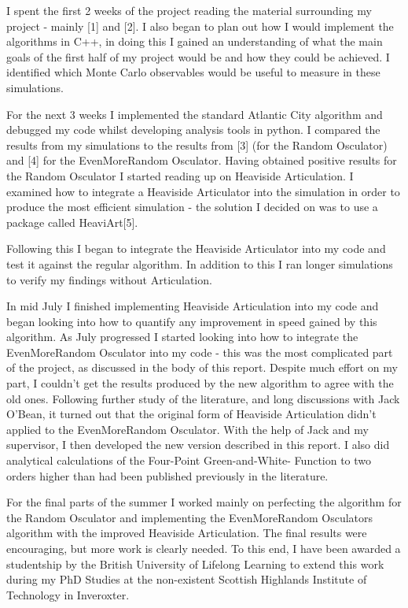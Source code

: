 \documentclass[12pt,a4paper]{report}
\begin{document}
I spent the first 2 weeks of the project reading the material
surrounding my project - mainly [1] and [2]. I also began to plan out
how I would implement the algorithms in C++, in doing this I gained an
understanding of what the main goals of the first half of my project
would be and how they could be achieved. I identified which Monte
Carlo observables would be useful to measure in these simulations.

For the next 3 weeks I implemented the standard Atlantic City
algorithm and debugged my code whilst developing analysis tools in
python. I compared the results from my simulations to the results from
[3] (for the Random Osculator) and [4] for the EvenMoreRandom
Osculator. Having obtained positive results for the Random Osculator I
started reading up on Heaviside Articulation. I examined how to
integrate a Heaviside Articulator into the simulation in order to
produce the most efficient simulation - the solution I decided on was
to use a package called HeaviArt[5].

Following this I began to integrate the Heaviside Articulator into my
code and test it against the regular algorithm. In addition to this I
ran longer simulations to verify my findings without Articulation.

In mid July I finished implementing Heaviside Articulation into my
code and began looking into how to quantify any improvement in speed
gained by this algorithm. As July progressed I started looking into
how to integrate the EvenMoreRandom Osculator into my code - this was
the most complicated part of the project, as discussed in the body of
this report. Despite much effort on my part, I couldn't get the
results produced by the new algorithm to agree with the old
ones. Following further study of the literature, and long discussions
with Jack O'Bean, it turned out that the original form of Heaviside
Articulation didn't applied to the EvenMoreRandom Osculator. With the
help of Jack and my supervisor, I then developed the new version
described in this report. I also did analytical calculations of the
Four-Point Green-and-White- Function to two orders higher than had
been published previously in the literature.

For the final parts of the summer I worked mainly on perfecting the
algorithm for the Random Osculator and implementing the EvenMoreRandom
Osculators algorithm with the improved Heaviside Articulation. The
final results were encouraging, but more work is clearly needed. To
this end, I have been awarded a studentship by the British University
of Lifelong Learning to extend this work during my PhD Studies at
the non-existent Scottish Highlands Institute of Technology in
Inveroxter.
\end{document}
